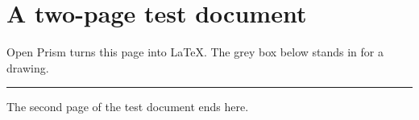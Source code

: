 \documentclass[a4paper,11pt]{article}
\begin{document}
\section*{A two-page test document}
Open Prism turns this page into LaTeX. The grey box below stands in for a drawing.

\bigskip
\noindent\textcolor{gray}{\rule{6cm}{4cm}}

\newpage
The second page of the test document ends here.
\end{document}
